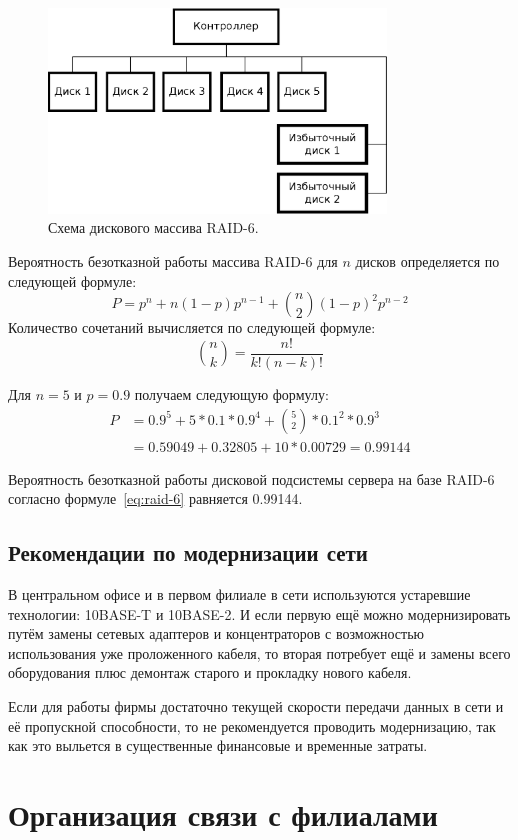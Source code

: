 \documentclass[russian,utf8,emptystyle]{eskdtext}
\begin{document}
\begin{figure}[h!]
\centering
\includegraphics[width=0.8\textwidth]{raid-6}
\caption{Схема дискового массива RAID-6.}
\label{fig:raid-6}
\end{figure}

Вероятность безотказной работы массива RAID-6 для $n$ дисков определяется по следующей формуле:
$$
P = p^n + n(1-p)p^{n-1} + {n \choose 2}(1-p)^2 p^{n-2}
$$
Количество сочетаний вычисляется по следующей формуле:
$$
{n \choose k} = \frac{n!}{k!(n-k)!}
$$

Для $n=5$ и $p=0.9$ получаем следующую формулу:
\begin{align} \label{eq:raid-6}
P & = 0.9^5 + 5*0.1*0.9^4 + {5 \choose 2}*0.1^2*0.9^3 \\
  & = 0.59049 + 0.32805 + 10*0.00729 = 0.99144
\end{align}

Вероятность безотказной работы дисковой подсистемы сервера на базе RAID-6 согласно формуле~\ref{eq:raid-6} равняется 0.99144.

\subsection{Рекомендации по модернизации сети}
В центральном офисе и в первом филиале в сети используются устаревшие технологии: 10BASE-T и 10BASE-2. И если первую ещё можно модернизировать путём замены сетевых адаптеров и концентраторов с возможностью использования уже проложенного кабеля, то вторая потребует ещё и замены всего оборудования плюс демонтаж старого и прокладку нового кабеля.

Если для работы фирмы достаточно текущей скорости передачи данных в сети и её пропускной способности, то не рекомендуется проводить модернизацию, так как это выльется в существенные финансовые и временные затраты.

\clearpage
\section{Организация связи с филиалами}
\end{document}

